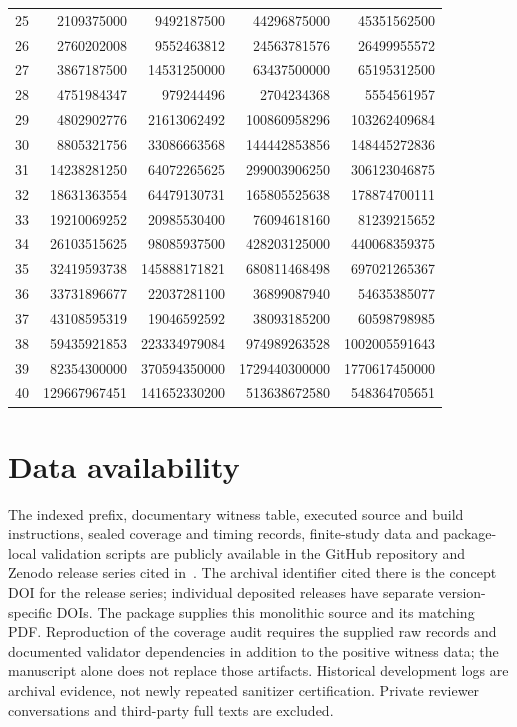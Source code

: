 \documentclass[11pt]{article}
\theoremstyle{definition}
\begin{document}
\begin{longtable}{rrrrr}
25 & 2109375000 & 9492187500 & 44296875000 & 45351562500\\
26 & 2760202008 & 9552463812 & 24563781576 & 26499955572\\
27 & 3867187500 & 14531250000 & 63437500000 & 65195312500\\
28 & 4751984347 & 979244496 & 2704234368 & 5554561957\\
29 & 4802902776 & 21613062492 & 100860958296 & 103262409684\\
30 & 8805321756 & 33086663568 & 144442853856 & 148445272836\\
31 & 14238281250 & 64072265625 & 299003906250 & 306123046875\\
32 & 18631363554 & 64479130731 & 165805525638 & 178874700111\\
33 & 19210069252 & 20985530400 & 76094618160 & 81239215652\\
34 & 26103515625 & 98085937500 & 428203125000 & 440068359375\\
35 & 32419593738 & 145888171821 & 680811468498 & 697021265367\\
36 & 33731896677 & 22037281100 & 36899087940 & 54635385077\\
37 & 43108595319 & 19046592592 & 38093185200 & 60598798985\\
38 & 59435921853 & 223334979084 & 974989263528 & 1002005591643\\
39 & 82354300000 & 370594350000 & 1729440300000 & 1770617450000\\
40 & 129667967451 & 141652330200 & 513638672580 & 548364705651\\
\end{longtable}
\endgroup

\section*{Data availability}
The indexed prefix, documentary witness table, executed source and build
instructions, sealed coverage and timing records, finite-study data and
package-local validation scripts are publicly available in the GitHub
repository and Zenodo release series cited in~\cite{project}. The archival identifier cited there is the concept DOI for the release
series; individual deposited releases have separate version-specific DOIs.
The package supplies this monolithic source and its matching PDF.
Reproduction of the coverage audit requires the supplied raw records and
documented validator dependencies in addition to the positive witness data;
the manuscript alone does not replace those artifacts. Historical development
logs are archival evidence, not newly repeated sanitizer certification.
Private reviewer conversations and third-party full texts are excluded.
\end{document}
